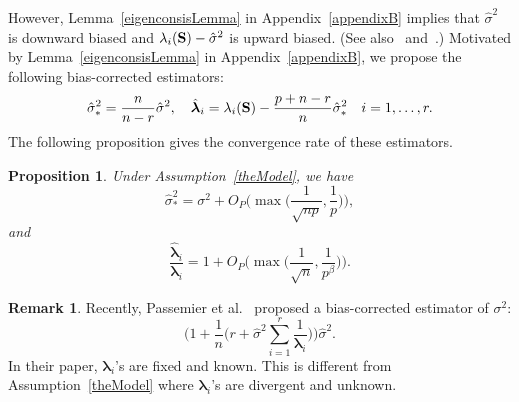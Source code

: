 \documentclass[times,sort&compress,3p]{elsarticle}
\newcommand{\bfsym}[1]{\ensuremath{\boldsymbol{#1}}}
\def\blambda {\bfsym {\lambda}}        \def\bLambda {\bfsym {\Lambda}}
\theoremstyle{plain}
\newtheorem{proposition}{\quad\quad Proposition}
\theoremstyle{definition}
\newtheorem{remark}{\quad\quad Remark}
\theoremstyle{remark}
\begin{document}
However, Lemma~\ref{eigenconsisLemma} in Appendix~\ref{appendixB} implies that $\hat{\sigma}^2$ is downward biased and $\lambda_i(\mathbf{S})-\hat{\sigma}^2$ is upward biased.
(See also~\cite{Fan2015Asymptotics} and~\cite{Passemier2015}.)
Motivated by Lemma~\ref{eigenconsisLemma} in Appendix~\ref{appendixB}, we propose the following bias-corrected estimators:
$$
\hat{\sigma}_*^2= \frac{n}{n-r} \hat{\sigma}^2,
\quad
\hat{\blambda}_i=\lambda_i(\BS)-\frac{p+n-r}{n}\hat{\sigma}_*^2
\quad i=1,\ldots,r.
$$
The following proposition gives the convergence rate of these estimators.
\begin{proposition}\label{varianceEstimation}
    Under Assumption~\ref{theModel}, we have %
    \begin{equation}\label{varianceEstimationPropResult1}
    \hat{\sigma}_*^2=\sigma^2 + O_P\Big(\max \big(\frac{1}{\sqrt{np}},\frac{1}{p}\big)\Big),
    \end{equation}
    and
    \begin{equation}\label{varianceEstimationPropResult2}
        \frac{\hat{\blambda}_i}{\blambda_i}
        =
        1+
        O_P\Big(\max\big(\frac{1}{\sqrt{n}},\frac{1}{p^{\beta}}\big)\Big).
    \end{equation}
\end{proposition}
\begin{remark}
    Recently, Passemier {\rm et al.}~\cite{Passemier2015} proposed a bias-corrected estimator of $\sigma^2$:
$$
\Big(1+\frac{1}{n}\big(r+\hat{\sigma}^2\sum_{i=1}^r \frac{1}{\blambda_i}\big)\Big)\hat{\sigma}^2.
$$
In their paper, $\blambda_i$'s are fixed and known.
    This is different from Assumption~\ref{theModel} where $\blambda_i$'s are divergent and unknown.
\end{remark}
\end{document}
